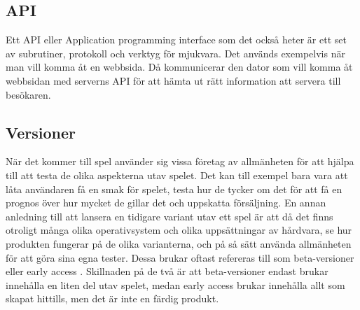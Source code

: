 \subsection{API}
Ett API eller Application programming interface som det också heter är ett set av subrutiner, protokoll och verktyg för mjukvara. Det används exempelvis när man vill komma åt en webbsida. Då kommunicerar den dator som vill komma åt webbsidan med serverns API för att hämta ut rätt information att servera till besökaren. \cite{bib-API}

\subsection{Versioner}
När det kommer till spel använder sig vissa företag av allmänheten för att hjälpa till att testa de olika aspekterna utav spelet. Det kan till exempel bara vara att låta användaren få en smak för spelet, testa hur de tycker om det för att få en prognos över hur mycket de gillar det och uppskatta försäljning. En annan anledning till att lansera en tidigare variant utav ett spel är att då det finns otroligt många olika operativsystem och olika uppsättningar av hårdvara, se hur produkten fungerar på de olika varianterna, och på så sätt använda allmänheten för att göra sina egna tester. Dessa brukar oftast refereras till som beta-versioner eller early access \cite{bib-beta-version}. Skillnaden på de två är att beta-versioner endast brukar innehålla en liten del utav spelet, medan early access brukar innehålla allt som skapat hittills, men det är inte en färdig produkt.
